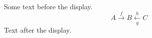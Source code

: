 \documentclass[12pt]{article}
\begin{document}
Some text before the display.
\[ A \xrightarrow{f} B \xleftarrow[g]{h} C \]
Text after the display.
\end{document}
